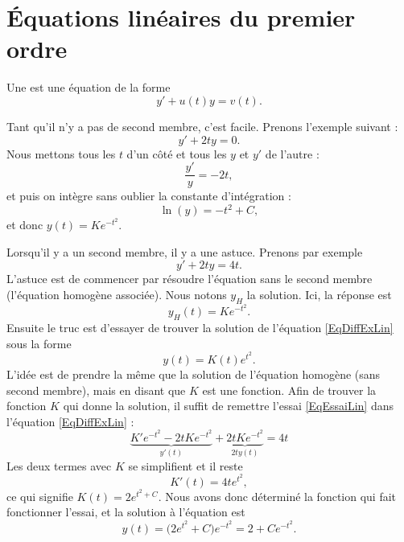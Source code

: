 \section{Équations linéaires du premier ordre}

Une  est une équation de la forme
\begin{equation}
	y'+u(t)y=v(t).
\end{equation}

\begin{example}
Tant qu'il n'y a pas de second membre, c'est facile. Prenons l'exemple suivant :
\begin{equation}
	y'+2ty=0.
\end{equation}
Nous mettons tous les $t$ d'un côté et tous les $y$ et $y'$ de l'autre :
\begin{equation}
	\frac{ y' }{ y }=-2t,
\end{equation}
et puis on intègre sans oublier la constante d'intégration :
\begin{equation}
	\ln(y)=-t^2+C,
\end{equation}
et donc $y(t)=K e^{-t^2}$.
\end{example}

Lorsqu'il y a un second membre, il y a une astuce. Prenons par exemple
\begin{equation}		\label{EqDiffExLin}
	y'+2ty=4t.
\end{equation}
L'astuce est de commencer par résoudre l'équation sans le second membre (l'équation homogène associée). Nous notons $y_H$ la solution. Ici, la réponse est
\begin{equation}
	y_H(t)=K e^{-t^2}.
\end{equation}
Ensuite le truc est d'essayer de trouver la solution de l'équation \eqref{EqDiffExLin} sous la forme
\begin{equation}		\label{EqEssaiLin}
	y(t)=K(t) e^{t^2}.
\end{equation}
L'idée est de prendre la même que la solution de l'équation homogène (sans second membre), mais en disant que $K$ est une fonction. Afin de trouver la fonction $K$ qui donne la solution, il suffit de remettre l'essai \eqref{EqEssaiLin} dans l'équation \eqref{EqDiffExLin} :
\begin{equation}
	\underbrace{K' e^{-t^2}-2tK e^{-t^2}}_{y'(t)}+\underbrace{2tK e^{-t^2}}_{2ty(t)}=4t
\end{equation}
Les deux termes avec $K$ se simplifient et il reste
\begin{equation}
	K'(t)=4t e^{t^2},
\end{equation}
ce qui signifie $K(t)=2 e^{t^2+C}$. Nous avons donc déterminé la fonction qui fait fonctionner l'essai, et la solution à l'équation est
\begin{equation}
	y(t)=\big( 2 e^{t^2}+C \big) e^{-t^2}=2+C e^{-t^2}.
\end{equation}


